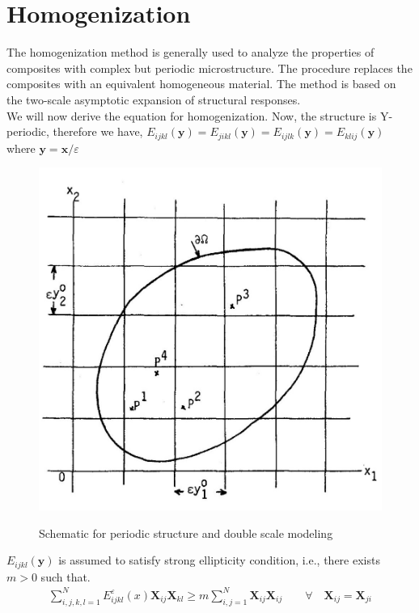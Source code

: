 \documentclass[openright,twoside]{iitkthesis}
\newcommand{\e}[1]{\textbf{#1}}
\begin{document}
\section{Homogenization}
The homogenization method is generally used to analyze the properties of composites with complex but periodic microstructure. The procedure replaces the composites with an equivalent homogeneous material. 
The method is based on the two-scale asymptotic expansion of structural responses.\\
We will now derive the equation for homogenization. 
Now, the structure is Y-periodic, therefore we have, $E_{ijkl}(\e y) =E_{jikl}(\e y) =E_{ijlk}(\e y) =E_{klij}(\e y)$ where $\e y = \e x/\varepsilon$
\begin{figure}[H]
\begin{center}
    \includegraphics[scale=0.2]{./Plots/homo/2.jpg}
    \label{fig:doublescale}
    \caption{Schematic for periodic structure and double scale modeling}
\end{center}
\end{figure}
$E_{ijkl}(\e y)$ is assumed to satisfy strong ellipticity condition, i.e., there exists $m>0$ such that.
\begin{gather}
\sum_{i,j,k,l=1}^N E_{ijkl}^\varepsilon(x)\textbf{X}_{ij}\textbf{X}_{kl}\geq m\sum_{i,j=1}^N\textbf{X}_{ij}\textbf{X}_{ij} \qquad \forall \quad \textbf{X}_{ij}=\textbf{X}_{ji}
\end{gather}
\end{document}
